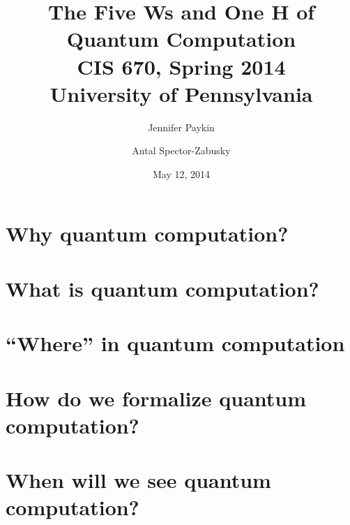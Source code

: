 \documentclass[12pt]{amsart}
\title{The Five Ws and One H of Quantum Computation\\
CIS 670, Spring 2014 \\
University of Pennsylvania
}
\author{Jennifer Paykin \and Antal Spector-Zabusky}
\date{May 12, 2014}
\begin{document}
\maketitle

\section{Why quantum computation?}\label{sec:why}


\section{What is quantum computation?}\label{sec:what}


\section{``Where'' in quantum computation}\label{sec:where}


\section{How do we formalize quantum computation?}\label{sec:how}


\section{When will we see quantum computation?}\label{sec:when}


\def\refname{Who's who in quantum computation}


\end{document}
